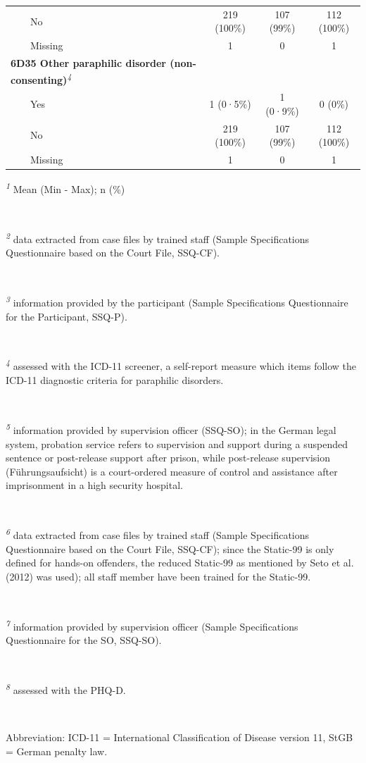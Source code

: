 \documentclass[
  super,
  preprint,
  1p,
  onecolumn]{elsarticle}
\begin{document}
\begin{table}
{\begin{tabular*}{\linewidth}{@{\extracolsep{\fill}}lccc}
    No & 219 (100\%) & 107 (99\%) & 112 (100\%) \\ 
    Missing & 1 & 0 & 1 \\ 
{\bfseries 6D35 Other paraphilic disorder (non-consenting)}\textsuperscript{\textit{4}} &  &  &  \\ 
    Yes & 1 (0·5\%) & 1 (0·9\%) & 0 (0\%) \\ 
    No & 219 (100\%) & 107 (99\%) & 112 (100\%) \\ 
    Missing & 1 & 0 & 1 \\ 
\bottomrule
\end{tabular*}
\begin{minipage}{\linewidth}
\vspace{.05em}
\parbox{\linewidth}{\raggedright {\textsuperscript{\textit{1}} Mean (Min - Max); n (\%)}}\\
\parbox{\linewidth}{\raggedright {\textsuperscript{\textit{2}} data extracted from case files by trained staff (Sample Specifications Questionnaire based on the Court File, SSQ-CF).}}\\
\parbox{\linewidth}{\raggedright {\textsuperscript{\textit{3}} information provided by the participant (Sample Specifications Questionnaire for the Participant, SSQ-P).}}\\
\parbox{\linewidth}{\raggedright {\textsuperscript{\textit{4}} assessed with the ICD-11 screener, a self-report measure which items follow the ICD-11 diagnostic criteria for paraphilic disorders.}}\\
\parbox{\linewidth}{\raggedright {\textsuperscript{\textit{5}} information provided by supervision officer (SSQ-SO); in the German legal system, probation service refers to supervision and support during a suspended sentence or post-release support after prison, while post-release supervision (Führungsaufsicht) is a court-ordered measure of control and assistance after imprisonment in a high security hospital.}}\\
\parbox{\linewidth}{\raggedright {\textsuperscript{\textit{6}} data extracted from case files by trained staff (Sample Specifications Questionnaire based on the Court File, SSQ-CF); since the Static-99 is only defined for hands-on offenders, the reduced Static-99 as mentioned by Seto et al. (2012) was used); all staff member have been trained for the Static-99.}}\\
\parbox{\linewidth}{\raggedright {\textsuperscript{\textit{7}} information provided by supervision officer (Sample Specifications Questionnaire for the SO, SSQ-SO).}}\\
\parbox{\linewidth}{\raggedright {\textsuperscript{\textit{8}} assessed with the PHQ-D.}}\\
\parbox{\linewidth}{\raggedright {Abbreviation: ICD-11 = International Classification of Disease version 11, StGB = German penalty law.\\
}}\end{minipage}

}

\end{table}%
\end{document}
